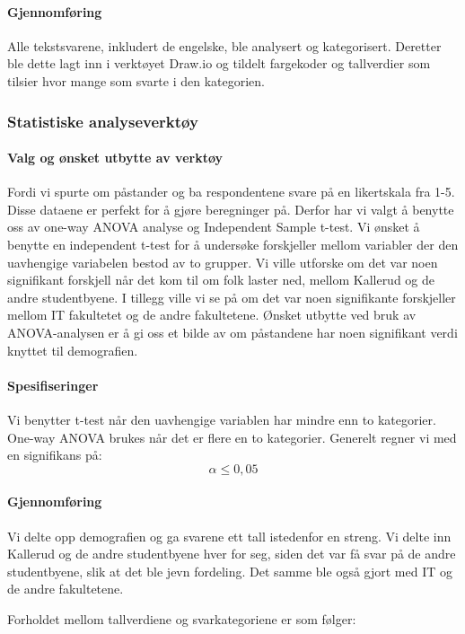\paragraph{Gjennomføring}
Alle tekstsvarene, inkludert de engelske, ble analysert og kategorisert. Deretter ble dette lagt inn i verktøyet Draw.io og tildelt fargekoder og tallverdier som tilsier hvor mange som svarte i den kategorien. 


\subsubsection{Statistiske analyseverktøy}

\paragraph{Valg og ønsket utbytte av verktøy}
Fordi vi spurte om påstander og ba respondentene svare på en likertskala fra 1-5. Disse dataene er perfekt for å gjøre beregninger på. Derfor har vi valgt å benytte oss av one-way ANOVA analyse og Independent Sample t-test. Vi ønsket å benytte en independent t-test for å undersøke forskjeller mellom variabler der den uavhengige variabelen bestod av to grupper. Vi ville utforske om det var noen signifikant forskjell når det kom til om folk laster ned, mellom Kallerud og de andre studentbyene. I tillegg ville vi se på om det var noen signifikante forskjeller mellom IT fakultetet og de andre fakultetene. Ønsket utbytte ved bruk av ANOVA-analysen er å gi oss et bilde av om påstandene har noen signifikant verdi knyttet til demografien.

\paragraph{Spesifiseringer}
Vi benytter t-test når den uavhengige variablen har mindre enn to kategorier. One-way ANOVA brukes når det er flere en to kategorier. Generelt regner vi med en signifikans på: \[\alpha \le 0,05\]

\paragraph{Gjennomføring}
Vi delte opp demografien og ga svarene ett tall istedenfor en streng. Vi delte inn Kallerud og de andre studentbyene hver for seg, siden det var få svar på de andre studentbyene, slik at det ble jevn fordeling. Det samme ble også gjort med IT og de andre fakultetene. 

Forholdet mellom tallverdiene og svarkategoriene er som følger:

